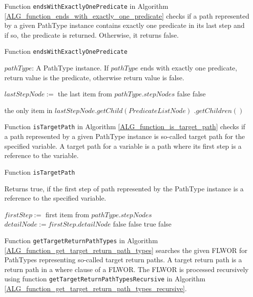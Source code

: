 Function \texttt{endsWithExactlyOnePredicate} in Algorithm \ref{ALG_function_ends_with_exactly_one_predicate} checks if a path represented by a given PathType instance contains exactly one predicate in its last step and if so, the predicate is returned. Otherwise, it returns false.

\begin{algorithm}
\caption{Function \texttt{endsWithExactlyOnePredicate}}
\label{ALG_function_ends_with_exactly_one_predicate}
\begin{algorithmic}[1]
\REQUIRE $pathType$: A PathType instance.
\ENSURE If $pathType$ ends with exactly one predicate, return value is the predicate, otherwise return value is false.

\STATE $lastStepNode :=$ the last item from $pathType.stepNodes$
	\RETURN false
\ENDIF
{}
	\RETURN false
\ENDIF

\RETURN the only item in $lastStepNode.getChild(PredicateListNode)$ $.getChildren()$
\end{algorithmic}
\end{algorithm}

Function \texttt{isTargetPath} in Algorithm \ref{ALG_function_is_target_path} checks if a path represented by a given PathType instance is so-called target path for the specified variable. A target path for a variable is a path where its first step is a reference to the variable.

\begin{algorithm}
\caption{Function \texttt{isTargetPath}}
\label{ALG_function_is_target_path}
\begin{algorithmic}[1]
\ENSURE Returns true, if the first step of path represented by the PathType instance is a reference to the specified variable.

\STATE $firstStep :=$ first item from  $pathType.stepNodes$
\STATE $detailNode := firstStep.detailNode$
	\RETURN false
\ENDIF
{}
	\RETURN false
\ENDIF
{}
	\RETURN true
\ELSE
	\RETURN false
\ENDIF
\end{algorithmic}
\end{algorithm}

Function \texttt{getTargetReturnPathTypes} in Algorithm \ref{ALG_function_get_target_return_path_types} searches the given FLWOR for PathTypes representing so-called target return paths. A target return path is a return path in a where clause of a FLWOR. The FLWOR is processed recursively using function \texttt{getTargetReturnPathTypesRecursive} in Algorithm \ref{ALG_function_get_target_return_path_types_recursive}.

